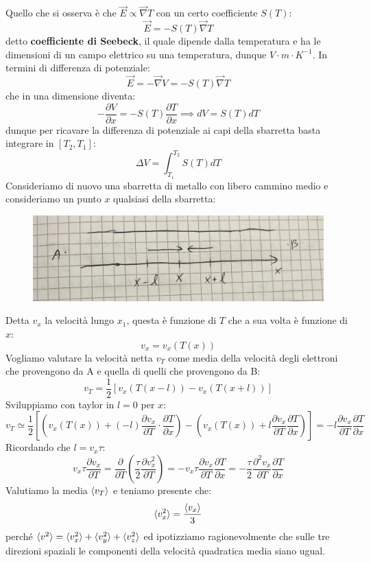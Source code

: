 \documentclass{book}
\begin{document}
            Quello che si osserva è che $\vec{E} \propto \vec{\nabla} T$ con un certo coefficiente $S(T)$:
            $$\vec{E} = - S(T)\vec{\nabla}T$$
            detto \textbf{coefficiente di Seebeck}, il quale dipende dalla temperatura e ha le dimensioni di un campo elettrico su una temperatura, dunque $V \cdot m \cdot K^{-1}$.
            In termini di differenza di potenziale:
            $$\vec{E} =- \vec{\nabla}V = -S(T) \vec{\nabla}T$$
            che in una dimensione diventa:
            $$- \frac{\partial V}{\partial x} = - S(T) \frac{\partial T}{\partial x} \implies dV = S(T)dT$$
            dunque per ricavare la differenza di potenziale ai capi della sbarretta basta integrare in $[T_{2},T_{1}]$:
            $$\Delta V = \int_{T_{1}} ^{T_{2}} S(T)dT$$
            Consideriamo di nuovo una sbarretta di metallo con libero cammino medio e consideriamo un punto $x$ qualsiasi della sbarretta:
            \begin{figure}[h!]
                \centering
                \includegraphics[width=0.5\linewidth]{img/sbarrettapt2.png}
            \end{figure}
            Detta $v_{x}$ la velocità lungo $x_{1}$, questa è funzione di $T$ che a sua volta è funzione di $x$:
            $$v_{x} = v_{x}(T(x))$$
            Vogliamo valutare la velocità netta $v_{T}$ come media della velocità degli elettroni che provengono da A e quella di quelli che provengono da B:
            $$v_{T} = \frac{1}{2} [v_{x}(T(x-l))-v_{x}(T(x+l))]$$
            Sviluppiamo con taylor in $l=0$ per $x$:
            $$v_{T} \simeq \frac{1}{2} [(v_{x}(T(x))+(-l)\frac{\partial v_{x}}{\partial T} \cdot \frac{\partial T}{\partial x})-(v_{x}(T(x))+l \frac{\partial v_{x}}{\partial T} \frac{\partial T}{\partial x})] = -l \frac{\partial v_{x}}{\partial T} \frac{\partial T}{\partial x}$$
            Ricordando che $l=v_{x}\tau$:
            $$\displaystyle v_{x}\tau \frac{\partial v_{x}}{\partial T} = \frac{\partial}{\partial T} (\frac{\tau}{2}\frac{\partial v_{x} ^{2}}{\partial T}) = -v_{x}\tau \frac{\partial v_{x}}{\partial T} \frac{\partial T}{\partial x} = -\frac{\tau}{2} \frac{\partial ^{2}v_{x}}{\partial T} \frac{\partial T}{\partial x}$$
            Valutiamo la media $\braket{v_{T}}$ e teniamo presente che:
            $$\braket{v_{x} ^{2}} = \frac{\braket{v_{x}}}{3}$$ perché $\braket{v^{2}} = \braket{v_{x}^{2}}+\braket{v_{y}^{2}}+\braket{v_{z} ^{2}}$ ed ipotizziamo ragionevolmente che sulle tre direzioni spaziali le componenti della velocità quadratica media siano ugual.
\end{document}
